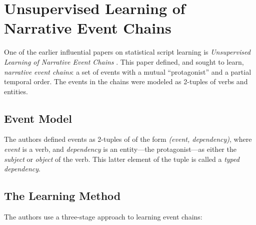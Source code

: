 \section{Unsupervised Learning of Narrative Event Chains}
\label{sec:chambers}

One of the earlier influential papers on statistical script learning is \textit{Unsupervised Learning of Narrative Event Chains} \citep{chambers2008unsupervised}. This paper defined, and sought to learn, \textit{narrative event chains}: a set of events with a mutual ``protagonist'' and a partial temporal order. The events in the chains were modeled as 2-tuples of verbs and entities.

\subsection{Event Model}
The authors defined events as 2-tuples of of the form \textit{(event, dependency)}, where \textit{event} is a verb, and \textit{dependency} is an entity---the protagonist---as either the \textit{subject} or \textit{object} of the verb. This latter element of the tuple is called a \textit{typed dependency}.

\subsection{The Learning Method}
The authors use a three-stage approach to learning event chains:

